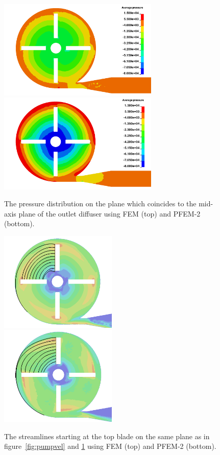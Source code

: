 \begin{figure}[htbp]
    \centering
    \includegraphics[width=3in]{imgs/nozzle_pump/pumppres_fem.png}\\
    \vspace{.5cm}
    \includegraphics[width=3in]{imgs/nozzle_pump/pumppres_pfem.png}
    \caption{The pressure distribution on the plane which coincides to the mid-axis plane of the outlet diffuser using FEM (top) and PFEM-2 (bottom).}
    \label{fig:pumppres}
\end{figure}

\begin{figure}[htbp]
    \centering
    \includegraphics[width=2.2in]{imgs/nozzle_pump/pump_sl_fem.png}\\
    \vspace{.5cm}
    \includegraphics[width=2.2in]{imgs/nozzle_pump/pump_sl_pfem.png}
    \caption{The streamlines starting at the top blade on the same plane as in figure~\ref{fig:pumpvel} and \ref{fig:pumppres} using FEM (top) and PFEM-2 (bottom).}
    \label{fig:pumpsl}
\end{figure}

